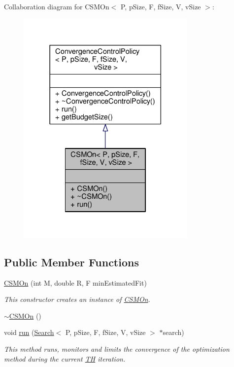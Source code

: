 Collaboration diagram for C\+S\+M\+On$<$ P, p\+Size, F, f\+Size, V, v\+Size $>$\+:\nopagebreak
\begin{figure}[H]
\begin{center}
\leavevmode
\includegraphics[width=249pt]{classCSMOn__coll__graph}
\end{center}
\end{figure}
\subsection*{Public Member Functions}
\begin{DoxyCompactItemize}
\item 
\hyperlink{classCSMOn_aacd95cee8b48fc2d51120fbf7d2fd546}{C\+S\+M\+On} (int M, double R, F min\+Estimated\+Fit)
\begin{DoxyCompactList}\small\item\em This constructor creates an instance of \hyperlink{classCSMOn}{C\+S\+M\+On}. \end{DoxyCompactList}\item 
\hyperlink{classCSMOn_af77e878e14c14200a4e95457e611162b}{$\sim$\+C\+S\+M\+On} ()
\item 
void \hyperlink{classCSMOn_a430398bc3e096631f8cd180ee1877616}{run} (\hyperlink{classSearch}{Search}$<$ P, p\+Size, F, f\+Size, V, v\+Size $>$ $\ast$search)
\begin{DoxyCompactList}\small\item\em This method runs, monitors and limits the convergence of the optimization method during the current \hyperlink{classTH}{TH} iteration. \end{DoxyCompactList}\end{DoxyCompactItemize}


